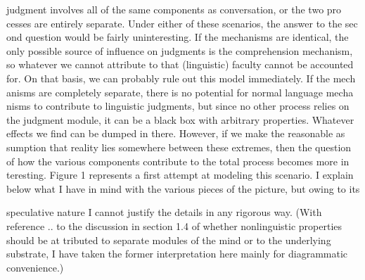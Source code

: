 \clearpage\setcounter{page}{1}\begin{styleTextbody}
judgment involves all of the same components as conversation, or the two pro\- cesses are entirely separate. Under either of these scenarios, the answer to the sec\- ond question would be fairly uninteresting. If the mechanisms are identical, the only possible source of influence on judgments is the comprehension mechanism, so whatever we cannot attribute to that (linguistic) faculty cannot be accounted for. On that basis, we can probably rule out this model immediately. If the mech\- anisms are completely separate, there is no potential for normal language mecha\- nisms to contribute to linguistic judgments, but since no other process relies on the judgment module, it can be a black box with arbitrary properties. Whatever effects we find can be dumped in there. However, if we make the reasonable as\- sumption that reality lies somewhere between these extremes, then the question of how the various components contribute to the total process becomes more in\- teresting. Figure 1 represents a first attempt at modeling this scenario. I explain below what I have in mind with the various pieces of the picture, but owing to its
\end{styleTextbody}


\begin{styleTextbody}
speculative nature I cannot justify the details in any rigorous way. (With reference .. to the discussion in section 1.4 of whether nonlinguistic properties should be at\- tributed to separate modules of the mind or to the underlying substrate, I have taken the former interpretation here mainly for diagrammatic convenience.)
\end{styleTextbody}


